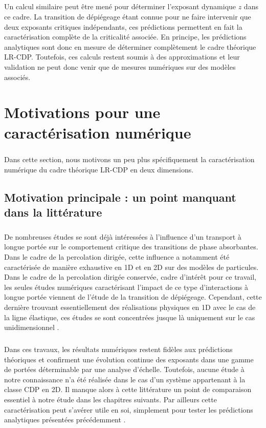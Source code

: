 \subparagraph{}Un calcul similaire peut être mené pour déterminer l'exposant dynamique $z$ dans ce cadre. La transition de dépiégeage étant connue pour ne faire intervenir que deux exposants critiques indépendants, ces prédictions permettent en fait la caractérisation complète de la criticalité associée. En principe, les prédictions analytiques sont donc en mesure de déterminer complètement le cadre théorique LR-CDP. Toutefois, ces calculs restent soumis à des approximations et leur validation ne peut donc venir que de mesures numériques sur des modèles associés.

\section{Motivations pour une caractérisation numérique}

\subparagraph{}Dans cette section, nous motivons un peu plus spécifiquement la caractérisation numérique du cadre théorique LR-CDP en deux dimensions.

\subsection{Motivation principale : un point manquant dans la littérature}

\subparagraph{}De nombreuses études se sont déjà intéressées à l'influence d'un transport à longue portée sur le comportement critique des transitions de phase absorbantes. Dans le cadre de la percolation dirigée, cette influence a notamment été caractérisée de manière exhaustive en 1D \cite{hinrichsen_model_1999, hinrichsen_non_equilibrium_2007} et en 2D \cite{dos_santos_crossover_2018} sur des modèles de particules. Dans le cadre de la percolation dirigée conservée, cadre d'intérêt pour ce travail, les seules études numériques caractérisant l'impact de ce type d'interactions à longue portée viennent de l'étude de la transition de dépiégeage. Cependant, cette dernière trouvant essentiellement des réalisations physiques en 1D avec le cas de la ligne élastique, ces études se sont concentrées jusque là uniquement sur le cas unidimensionnel \cite{le_priol_long_range_2020, tanguy_individual_1998, rosso_roughness_2002, ramanathan_onset_1998}.

\subparagraph{}Dans ces travaux, les résultats numériques restent fidèles aux prédictions théoriques et confirment une évolution continue des exposants dans une gamme de portées déterminable par une analyse d'échelle. Toutefois, aucune étude à notre connaissance n'a été réalisée dans le cas d'un système appartenant à la classe CDP en 2D. Il manque alors à cette littérature un point de comparaison essentiel à notre étude dans les chapitres suivants. Par ailleurs cette caractérisation peut s'avérer utile en soi, simplement pour tester les prédictions analytiques présentées précédemment \cite{le_doussal_two_loop_2002}.

